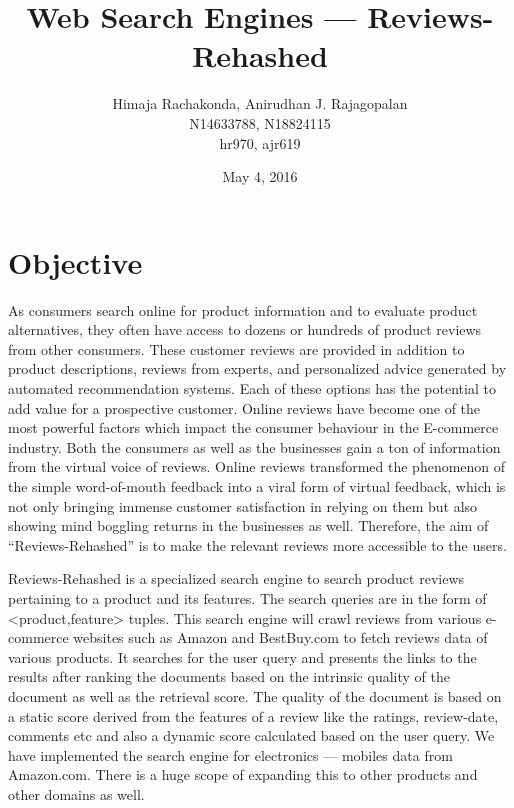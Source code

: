 \documentclass{article}
\begin{document}
\title{Web Search Engines --- Reviews-Rehashed}
\date{May 4, 2016}
\author{Himaja Rachakonda, Anirudhan J. Rajagopalan\\ N14633788, N18824115\\ hr970, ajr619}
\maketitle
\newpage

\section{Objective}

As consumers search online for product information and to evaluate product alternatives, they often have access to dozens or hundreds of product reviews from other consumers. These customer reviews are provided in addition to product descriptions, reviews from experts, and personalized advice generated by automated recommendation systems. Each of these options has the potential to add value for a prospective customer. Online reviews have become one of the most powerful factors which impact the consumer behaviour in the E-commerce industry. Both the consumers as well as the businesses gain a ton of information from the virtual voice of reviews. Online reviews transformed the phenomenon of the simple word-of-mouth feedback into a viral form of virtual feedback, which is not only bringing immense customer satisfaction in relying on them but also showing mind boggling returns in the businesses as well. Therefore, the aim of ``Reviews-Rehashed'' is to make the relevant reviews more accessible to the users. 

Reviews-Rehashed is a specialized search engine to search product reviews pertaining to a product and its features. The search queries are in the form of <product,feature> tuples. This search engine will crawl reviews from various e-commerce websites such as Amazon and BestBuy.com to fetch reviews data of various products. It searches for the user query and presents the links to the results after ranking the documents based on the intrinsic quality of the document as well as the retrieval score. The quality of the document is based on a static score derived from the features of a review like the ratings, review-date, comments etc and also a dynamic score calculated based on the user query. We have implemented the search engine for electronics --- mobiles data from Amazon.com. There is a huge scope of expanding this to other products and other domains as well.
\end{document}
